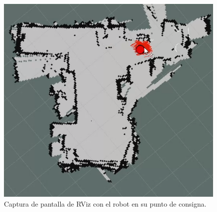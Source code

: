 \begin{figure}[ht]
    \centering
    \includegraphics[scale=0.35]{./Figures/robot_en_setpoint.png}
    \caption{Captura de pantalla de RViz con el robot en su punto de consigna.}
    \label{fig:robotEnSetpoint}
\end{figure}